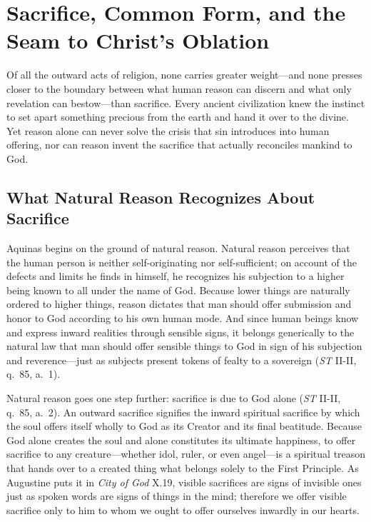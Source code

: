 \section{Sacrifice, Common Form, and the Seam to Christ's Oblation}

Of all the outward acts of religion, none carries greater weight---and none presses closer to the boundary between what human reason can discern and what only revelation can bestow---than sacrifice. Every ancient civilization knew the instinct to set apart something precious from the earth and hand it over to the divine. Yet reason alone can never solve the crisis that sin introduces into human offering, nor can reason invent the sacrifice that actually reconciles mankind to God.

\subsection{What Natural Reason Recognizes About Sacrifice}

Aquinas begins on the ground of natural reason. Natural reason perceives that the human person is neither self-originating nor self-sufficient; on account of the defects and limits he finds in himself, he recognizes his subjection to a higher being known to all under the name of God. Because lower things are naturally ordered to higher things, reason dictates that man should offer submission and honor to God according to his own human mode. And since human beings know and express inward realities through sensible signs, it belongs generically to the natural law that man should offer sensible things to God in sign of his subjection and reverence---just as subjects present tokens of fealty to a sovereign (\emph{ST} II-II, q.\ 85, a.\ 1).

Natural reason goes one step further: sacrifice is due to God alone (\emph{ST} II-II, q.\ 85, a.\ 2). An outward sacrifice signifies the inward spiritual sacrifice by which the soul offers itself wholly to God as its Creator and its final beatitude. Because God alone creates the soul and alone constitutes its ultimate happiness, to offer sacrifice to any creature---whether idol, ruler, or even angel---is a spiritual treason that hands over to a created thing what belongs solely to the First Principle. As Augustine puts it in \emph{City of God} X.19, visible sacrifices are signs of invisible ones just as spoken words are signs of things in the mind; therefore we offer visible sacrifice only to him to whom we ought to offer ourselves inwardly in our hearts.

